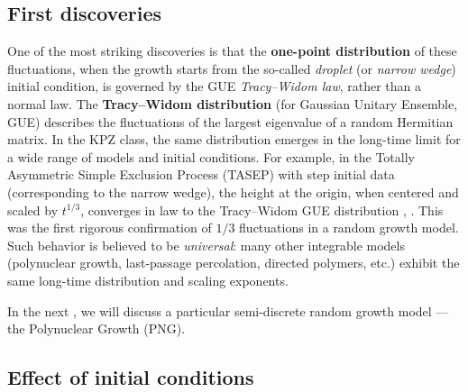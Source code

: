 \documentclass[letterpaper,11pt,oneside,reqno]{article}
\numberwithin{equation}{section}
\theoremstyle{definition}
\begin{document}
\subsection{First discoveries}

One of the most striking discoveries is that the
\textbf{one-point distribution} of these fluctuations,
when the growth starts from the so-called
\emph{droplet} (or \emph{narrow wedge}) initial condition,
is
governed by the GUE \emph{Tracy–Widom law},
rather than a normal law. The \textbf{Tracy–Widom
distribution} (for Gaussian Unitary Ensemble, GUE) describes
the fluctuations of the largest eigenvalue of a random
Hermitian matrix. In the KPZ class, the same distribution
emerges in the long-time limit for a wide range of models
and initial conditions. For example,
in the Totally Asymmetric Simple Exclusion Process
(TASEP) with step initial data (corresponding to the narrow wedge), the height at the
origin, when centered and scaled by $t^{1/3}$, converges in
law to the Tracy–Widom GUE distribution
\cite{johansson2000shape},
\cite{remenik2023integrable}.
This was the first rigorous confirmation of $1/3$
fluctuations in a random growth model.
Such behavior is believed
to be \emph{universal}: many other integrable models
(polynuclear growth, last-passage percolation, directed
polymers, etc.) exhibit the same long-time distribution and
scaling exponents.

In the next , we will discuss a particular semi-discrete random
growth model --- the Polynuclear Growth (PNG).

\subsection{Effect of initial conditions}
\end{document}

